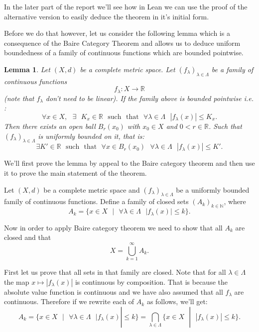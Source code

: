 \documentclass[11pt]{article}
\newcommand\st{\text{ } | \text{ }}
\newcommand\R{\mathbb{R}}
\newcommand\N{\mathbb{N}}
\newcommand\sucht{\sep \mathrm{such} \sep \mathrm{that} \sep}
\newcommand\sep{\text{ }}
\newtheorem*{lemma}{Lemma}
\begin{document}
In the later part of the report we'll see how in Lean
we can use the proof of the alternative version to easily deduce the theorem in it's
initial form.

Before we do that however, let us consider the following lemma which
is a consequence of the Baire Category Theorem and allows us to deduce uniform
boundedness of a family of continuous functions which are bounded pointwise.

\begin{lemma}
  Let $\left( X, d \right) $ be a complete metric space. Let
  $\left( f_\lambda \right)_{\lambda \in \Lambda} $ be a family of continuous
  functions $$f_\lambda : X \to \R $$ (note that $f_\lambda$ don't need to be linear).
  If the family above is bounded pointwise i.e. :
  \[
    \forall x \in X, \sep \exists \sep K_x \in \R \sucht \forall \lambda \in \Lambda \sep |f_\lambda(x)| \le K_x
  .\]
  Then there exists an open ball $B_r(x_0)$ with  $x_0 \in X$ and  $0 < r \in \R$.
  Such that $\left( f_\lambda \right)_{\lambda \in \Lambda} $ is uniformly bounded
  on it, that is:
  \[
    \exists K' \in \R \sucht \forall x \in B_r(x_0) \sep \forall \lambda \in \Lambda \sep |f_\lambda(x) | \le K'
  .\]
\end{lemma}

We'll first prove the lemma by appeal to the Baire category theorem and then
use it to prove the main statement of the theorem.

Let $\left( X, d \right) $ be a complete metric space and
$\left( f_\lambda \right)_{\lambda \in \Lambda} $ be a uniformly bounded family of continuous
functions. Define a family of closed sets $\left( A_k \right)_{k \in \N} $, where
\[
  A_k = \lbrace x \in X \st \forall \lambda \in \Lambda \sep | f_\lambda (x) | \le k \rbrace
.\]

Now in order to apply Baire category theorem we need to show that  all $A_k$ are
closed and that
\begin{equation}
X = \bigcup_{k = 1}^\infty A_k
.\end{equation}

First let us prove that all sets in that family are closed. Note that for all $\lambda \in \Lambda$ the map
 $x \mapsto |f_\lambda(x)| $ is continuous by composition. That is because the
 absolute value function is continuous and we have also assumed that all  $f_\lambda$
 are continuous. Therefore if we rewrite each of  $A_k$ as follows, we'll get:
  \[
    A_k = \lbrace x \in X \st \forall \lambda \in \Lambda \sep | f_\lambda (x) | \le k \rbrace = \bigcap_{\lambda \in \Lambda} \lbrace x \in X \st |f_\lambda(x)| \le k\rbrace
 .\]
\end{document}
